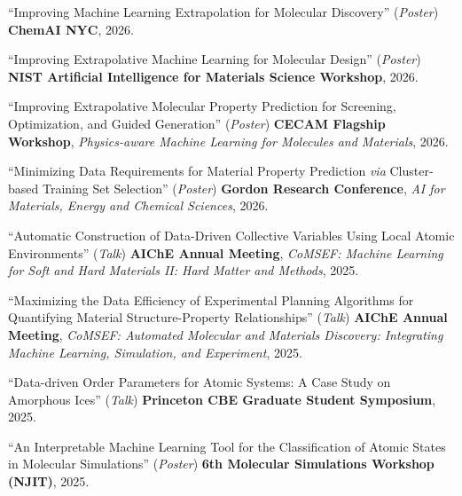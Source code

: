 \documentclass[letterpaper,11pt]{article}
\begin{document}
\begin{etaremune}

\item{\normalsize ``Improving Machine Learning Extrapolation for Molecular Discovery'' (\textit{Poster}) \textbf{ChemAI NYC}, 2026.\\

\item{\normalsize ``Improving Extrapolative Machine Learning for Molecular Design'' (\textit{Poster}) \textbf{NIST Artificial Intelligence for Materials Science Workshop}, 2026.\\

\item{\normalsize ``Improving Extrapolative Molecular Property Prediction for Screening, Optimization, and Guided Generation'' (\textit{Poster}) \textbf{CECAM Flagship Workshop}, \textit{Physics-aware Machine Learning for Molecules and Materials}, 2026.}\\

\item{\normalsize ``Minimizing Data Requirements for Material Property Prediction \textit{via} Cluster-based Training Set Selection'' (\textit{Poster}) \textbf{Gordon Research Conference}, \textit{AI for Materials, Energy and Chemical Sciences}, 2026.}\\

\item{\normalsize ``Automatic Construction of Data-Driven Collective Variables Using Local Atomic Environments'' (\textit{Talk}) \textbf{AIChE Annual Meeting}, \textit{CoMSEF: Machine Learning for Soft and Hard Materials II: Hard Matter and Methods}, 2025.}\\

\item{\normalsize ``Maximizing the Data Efficiency of Experimental Planning Algorithms for Quantifying Material Structure-Property Relationships'' (\textit{Talk}) \textbf{AIChE Annual Meeting}, \textit{CoMSEF: Automated Molecular and Materials Discovery: Integrating Machine Learning, Simulation, and Experiment}, 2025.}\\

\item{\normalsize ``Data-driven Order Parameters for Atomic Systems: A Case Study on Amorphous Ices'' (\textit{Talk}) \textbf{Princeton CBE Graduate Student Symposium}, 2025.}\\

\item{\normalsize ``An Interpretable Machine Learning Tool for the Classification
of Atomic States in Molecular Simulations'' (\textit{Poster}) \textbf{6th Molecular Simulations Workshop (NJIT)}, 2025.}\\

}}
\end{etaremune}
\end{document}
